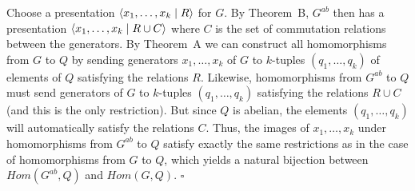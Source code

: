 \documentclass[12pt]{article}
\begin{document}
\sk Choose a presentation ${\langle} x_1,\ldots, x_k\mid R{\rangle}$ for $G$. By Theorem~B, $G^{ab}$ then has a presentation  ${\langle} x_1,\ldots, x_k\mid R\cup C{\rangle}$ where $C$ is the set of commutation relations between the generators.
By Theorem~A we can construct all homomorphisms from $G$ to $Q$ by sending generators $x_1,\ldots, x_k$ of $G$ to $k$-tuples 
$(q_1,\ldots,q_k)$ of elements of $Q$ satisfying the relations $R$. Likewise, homomorphisms from $G^{ab}$ to $Q$ must send generators of $G$ to $k$-tuples $(q_1,\ldots,q_k)$ satisfying the relations $R\cup C$ (and this is the only restriction). But since $Q$ is abelian, the elements  $(q_1,\ldots,q_k)$ will automatically satisfy the relations $C$. Thus, the images of $x_1,\ldots, x_k$ under homomorphisms from $G^{ab}$ to $Q$ satisfy exactly the same restrictions as in the case of homomorphisms from $G$ to $Q$, which yields a natural bijection between $Hom(G^{ab},Q)$ and $Hom(G,Q)$.
$\square$
\end{document}
